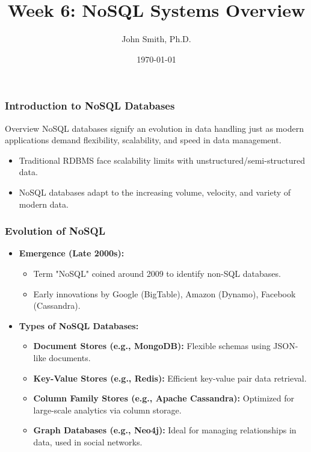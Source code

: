 \documentclass[aspectratio=169]{beamer}
\title[NoSQL Systems Overview]{Week 6: NoSQL Systems Overview}
\author[J. Smith]{John Smith, Ph.D.}
\institute[University Name]{
  Department of Computer Science\\
  University Name\\
  \vspace{0.3cm}
  Email: email@university.edu\\
  Website: www.university.edu
}
\date{\today}
\begin{document}
\frame{\titlepage}

\begin{frame}[fragile]
    \frametitle{Introduction to NoSQL Databases}
    \begin{block}{Overview}
        NoSQL databases signify an evolution in data handling just as modern applications demand flexibility, scalability, and speed in data management.
    \end{block}
    \begin{itemize}
        \item Traditional RDBMS face scalability limits with unstructured/semi-structured data.
        \item NoSQL databases adapt to the increasing volume, velocity, and variety of modern data.
    \end{itemize}
\end{frame}

\begin{frame}[fragile]
    \frametitle{Evolution of NoSQL}
    \begin{itemize}
        \item \textbf{Emergence (Late 2000s):}
        \begin{itemize}
            \item Term "NoSQL" coined around 2009 to identify non-SQL databases.
            \item Early innovations by Google (BigTable), Amazon (Dynamo), Facebook (Cassandra).
        \end{itemize}
        \item \textbf{Types of NoSQL Databases:}
        \begin{itemize}
            \item \textbf{Document Stores (e.g., MongoDB):} Flexible schemas using JSON-like documents.
            \item \textbf{Key-Value Stores (e.g., Redis):} Efficient key-value pair data retrieval.
            \item \textbf{Column Family Stores (e.g., Apache Cassandra):} Optimized for large-scale analytics via column storage.
            \item \textbf{Graph Databases (e.g., Neo4j):} Ideal for managing relationships in data, used in social networks.
        \end{itemize}
    \end{itemize}
\end{frame}
\end{document}
